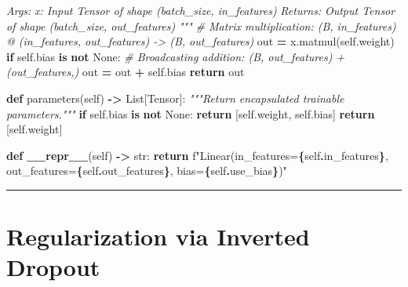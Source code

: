 \documentclass[
  letterpaper,
]{scrbook}
\newenvironment{Shaded}{\begin{snugshade}}{\end{snugshade}}
\newcommand{\BuiltInTok}[1]{#1}
\newcommand{\CommentTok}[1]{\textcolor[rgb]{0.56,0.35,0.01}{\textit{#1}}}
\newcommand{\ControlFlowTok}[1]{\textcolor[rgb]{0.13,0.29,0.53}{\textbf{#1}}}
\newcommand{\FunctionTok}[1]{\textcolor[rgb]{0.13,0.29,0.53}{\textbf{#1}}}
\newcommand{\KeywordTok}[1]{\textcolor[rgb]{0.13,0.29,0.53}{\textbf{#1}}}
\newcommand{\NormalTok}[1]{#1}
\newcommand{\OperatorTok}[1]{\textcolor[rgb]{0.81,0.36,0.00}{\textbf{#1}}}
\newcommand{\SpecialCharTok}[1]{\textcolor[rgb]{0.81,0.36,0.00}{\textbf{#1}}}
\newcommand{\SpecialStringTok}[1]{\textcolor[rgb]{0.31,0.60,0.02}{#1}}
\newcommand{\VariableTok}[1]{\textcolor[rgb]{0.00,0.00,0.00}{#1}}
\begin{document}
\begin{Shaded}
\begin{Highlighting}[]
\CommentTok{        Args:}
\CommentTok{            x: Input Tensor of shape (batch\_size, in\_features)}
\CommentTok{        Returns:}
\CommentTok{            Output Tensor of shape (batch\_size, out\_features)}
\CommentTok{        """}
        \CommentTok{\# Matrix multiplication: (B, in\_features) @ (in\_features, out\_features) {-}\textgreater{} (B, out\_features)}
\NormalTok{        out }\OperatorTok{=}\NormalTok{ x.matmul(}\VariableTok{self}\NormalTok{.weight)}
        \ControlFlowTok{if} \VariableTok{self}\NormalTok{.bias }\KeywordTok{is} \KeywordTok{not} \VariableTok{None}\NormalTok{:}
            \CommentTok{\# Broadcasting addition: (B, out\_features) + (out\_features,)}
\NormalTok{            out }\OperatorTok{=}\NormalTok{ out }\OperatorTok{+} \VariableTok{self}\NormalTok{.bias}
        \ControlFlowTok{return}\NormalTok{ out}

    \KeywordTok{def}\NormalTok{ parameters(}\VariableTok{self}\NormalTok{) }\OperatorTok{{-}\textgreater{}}\NormalTok{ List[Tensor]:}
        \CommentTok{"""Return encapsulated trainable parameters."""}
        \ControlFlowTok{if} \VariableTok{self}\NormalTok{.bias }\KeywordTok{is} \KeywordTok{not} \VariableTok{None}\NormalTok{:}
            \ControlFlowTok{return}\NormalTok{ [}\VariableTok{self}\NormalTok{.weight, }\VariableTok{self}\NormalTok{.bias]}
        \ControlFlowTok{return}\NormalTok{ [}\VariableTok{self}\NormalTok{.weight]}

    \KeywordTok{def} \FunctionTok{\_\_repr\_\_}\NormalTok{(}\VariableTok{self}\NormalTok{) }\OperatorTok{{-}\textgreater{}} \BuiltInTok{str}\NormalTok{:}
        \ControlFlowTok{return} \SpecialStringTok{f"Linear(in\_features=}\SpecialCharTok{\{}\VariableTok{self}\SpecialCharTok{.}\NormalTok{in\_features}\SpecialCharTok{\}}\SpecialStringTok{, out\_features=}\SpecialCharTok{\{}\VariableTok{self}\SpecialCharTok{.}\NormalTok{out\_features}\SpecialCharTok{\}}\SpecialStringTok{, bias=}\SpecialCharTok{\{}\VariableTok{self}\SpecialCharTok{.}\NormalTok{use\_bias}\SpecialCharTok{\}}\SpecialStringTok{)"}
\end{Highlighting}
\end{Shaded}

\begin{center}\rule{0.5\linewidth}{0.5pt}\end{center}

\section{Regularization via Inverted
Dropout}\label{regularization-via-inverted-dropout}
\end{document}
